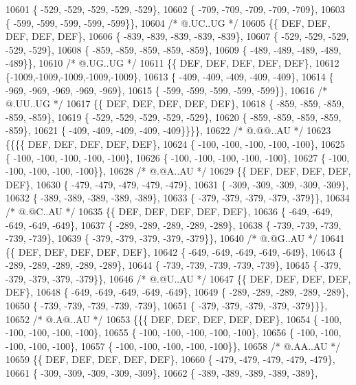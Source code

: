 \begin{DoxyCode}
10601 \{ -529, -529, -529, -529, -529\},
10602 \{ -709, -709, -709, -709, -709\},
10603 \{ -599, -599, -599, -599, -599\}\},
10604 \textcolor{comment}{/*  @.UC..UG */}
10605 \{\{  DEF,  DEF,  DEF,  DEF,  DEF\},
10606 \{ -839, -839, -839, -839, -839\},
10607 \{ -529, -529, -529, -529, -529\},
10608 \{ -859, -859, -859, -859, -859\},
10609 \{ -489, -489, -489, -489, -489\}\},
10610 \textcolor{comment}{/*  @.UG..UG */}
10611 \{\{  DEF,  DEF,  DEF,  DEF,  DEF\},
10612 \{-1009,-1009,-1009,-1009,-1009\},
10613 \{ -409, -409, -409, -409, -409\},
10614 \{ -969, -969, -969, -969, -969\},
10615 \{ -599, -599, -599, -599, -599\}\},
10616 \textcolor{comment}{/*  @.UU..UG */}
10617 \{\{  DEF,  DEF,  DEF,  DEF,  DEF\},
10618 \{ -859, -859, -859, -859, -859\},
10619 \{ -529, -529, -529, -529, -529\},
10620 \{ -859, -859, -859, -859, -859\},
10621 \{ -409, -409, -409, -409, -409\}\}\}\},
10622 \textcolor{comment}{/*  @.@@..AU */}
10623 \{\{\{\{  DEF,  DEF,  DEF,  DEF,  DEF\},
10624 \{ -100, -100, -100, -100, -100\},
10625 \{ -100, -100, -100, -100, -100\},
10626 \{ -100, -100, -100, -100, -100\},
10627 \{ -100, -100, -100, -100, -100\}\},
10628 \textcolor{comment}{/*  @.@A..AU */}
10629 \{\{  DEF,  DEF,  DEF,  DEF,  DEF\},
10630 \{ -479, -479, -479, -479, -479\},
10631 \{ -309, -309, -309, -309, -309\},
10632 \{ -389, -389, -389, -389, -389\},
10633 \{ -379, -379, -379, -379, -379\}\},
10634 \textcolor{comment}{/*  @.@C..AU */}
10635 \{\{  DEF,  DEF,  DEF,  DEF,  DEF\},
10636 \{ -649, -649, -649, -649, -649\},
10637 \{ -289, -289, -289, -289, -289\},
10638 \{ -739, -739, -739, -739, -739\},
10639 \{ -379, -379, -379, -379, -379\}\},
10640 \textcolor{comment}{/*  @.@G..AU */}
10641 \{\{  DEF,  DEF,  DEF,  DEF,  DEF\},
10642 \{ -649, -649, -649, -649, -649\},
10643 \{ -289, -289, -289, -289, -289\},
10644 \{ -739, -739, -739, -739, -739\},
10645 \{ -379, -379, -379, -379, -379\}\},
10646 \textcolor{comment}{/*  @.@U..AU */}
10647 \{\{  DEF,  DEF,  DEF,  DEF,  DEF\},
10648 \{ -649, -649, -649, -649, -649\},
10649 \{ -289, -289, -289, -289, -289\},
10650 \{ -739, -739, -739, -739, -739\},
10651 \{ -379, -379, -379, -379, -379\}\}\},
10652 \textcolor{comment}{/*  @.A@..AU */}
10653 \{\{\{  DEF,  DEF,  DEF,  DEF,  DEF\},
10654 \{ -100, -100, -100, -100, -100\},
10655 \{ -100, -100, -100, -100, -100\},
10656 \{ -100, -100, -100, -100, -100\},
10657 \{ -100, -100, -100, -100, -100\}\},
10658 \textcolor{comment}{/*  @.AA..AU */}
10659 \{\{  DEF,  DEF,  DEF,  DEF,  DEF\},
10660 \{ -479, -479, -479, -479, -479\},
10661 \{ -309, -309, -309, -309, -309\},
10662 \{ -389, -389, -389, -389, -389\},

\end{DoxyCode}
